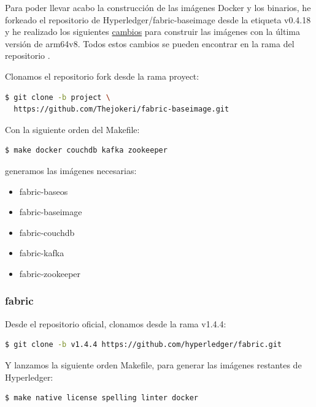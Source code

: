 Para poder llevar acabo la construcción de las imágenes Docker y los binarios, he forkeado el repositorio de 
Hyperledger/fabric-baseimage \cite{fabric-baseimage} desde la etiqueta v0.4.18 y he realizado los siguientes 
\href{https://github.com/Thejokeri/fabric-baseimage/commit/f3dfc7bcbdbd62c0c391aa3ce7eeb594ed6a3309}{cambios} para 
construir las imágenes con la última versión de arm64v8. Todos estos cambios se pueden encontrar en la rama  
del repositorio \cite{fork-fabric-baseimage}.

\newpage

\noindent Clonamos el repositorio fork desde la rama proyect:

\begin{lstlisting}[language=bash]
  $ git clone -b project \ 
  https://github.com/Thejokeri/fabric-baseimage.git
\end{lstlisting}

\noindent Con la siguiente orden del Makefile:

\begin{lstlisting}[language=bash]
  $ make docker couchdb kafka zookeeper
\end{lstlisting}

\noindent generamos las imágenes necesarias:

\begin{itemize}
  \item fabric-baseos
  \item fabric-baseimage
  \item fabric-couchdb
  \item fabric-kafka
  \item fabric-zookeeper
\end{itemize}

\subsubsection*{fabric}

\noindent Desde el repositorio oficial, clonamos desde la rama v1.4.4:

\begin{lstlisting}[language=bash]
  $ git clone -b v1.4.4 https://github.com/hyperledger/fabric.git
\end{lstlisting}

\noindent Y lanzamos la siguiente orden Makefile, para generar las imágenes restantes de Hyperledger:

\begin{lstlisting}[language=bash]
  $ make native license spelling linter docker
\end{lstlisting}

